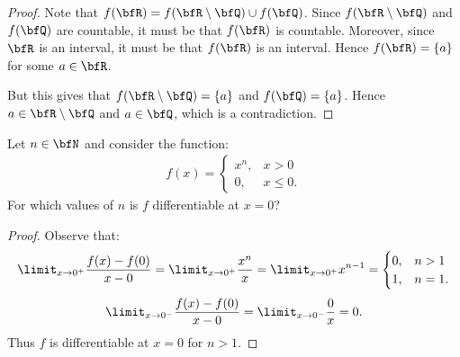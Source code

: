 \documentclass[11pt,twoside,openany]{memoir}
\begin{document}
        \begin{proof}
            Note that $f(\bfR) = f(\bfR \setminus \bfQ) \cup f(\bfQ)$. Since $f(\bfR \setminus \bfQ)$ and $f(\bfQ)$ are countable, it must be that $f(\bfR)$ is countable. Moreover, since $\bfR$ is an interval, it must be that $f(\bfR)$ is an interval. Hence $f(\bfR) = \{a\}$ for some $a \in \bfR$. \nl
            
            But this gives that $f(\bfR\setminus\bfQ) = \{a\}$ and $f(\bfQ) = \{a\}$. Hence $a \in \bfR\setminus\bfQ$ and $a \in \bfQ$, which is a contradiction.
        \end{proof}
    \begin{exercise}
        Let $n \in \bfN$ and consider the function:
            \begin{equation*}
            \begin{split}
                f(x) =
                    \begin{cases}
                        x^n, & x > 0 \\
                        0, & x \leq 0 .
                    \end{cases}
            \end{split}
            \end{equation*}
        For which values of $n$ is $f$ differentiable at $x = 0$?
    \end{exercise}
        \begin{proof}
            Observe that:
                \begin{equation*}
                \begin{split}
                    \limit_{x \rightarrow 0^+}\frac{f(x) - f(0)}{x-0} = \limit_{x \rightarrow 0^+}\frac{x^n}{x} = \limit_{x \rightarrow 0^+}x^{n-1} = \begin{cases} 0, & n > 1 \\ 1, & n = 1.\end{cases}
                \end{split}
                \end{equation*}
                \begin{equation*}
                \begin{split}
                    \limit_{x \rightarrow 0^-}\frac{f(x) - f(0)}{x-0} = \limit_{x \rightarrow 0^-}\frac{0}{x} = 0.
                \end{split}
                \end{equation*}
            Thus $f$ is differentiable at $x=0$ for $n > 1$.
        \end{proof}
\end{document}
